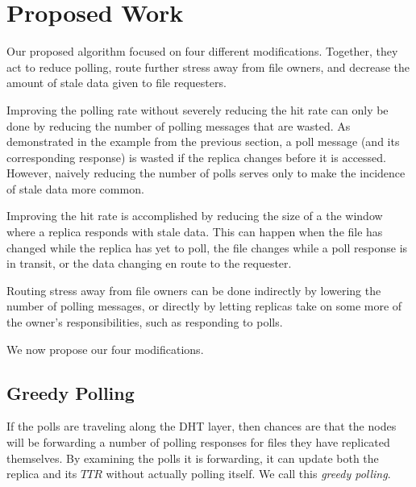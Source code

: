 \documentclass[10pt, conference, compsocconf, letterpaper]{IEEEtran} %
\begin{document}






\section{Proposed Work}

Our proposed algorithm focused on four different modifications.  Together, they act to reduce polling, route further stress away from file owners, and decrease the amount of stale data given to file requesters.
 
Improving the polling rate without severely reducing the hit rate can only be done by reducing the number of polling messages that are wasted.  As demonstrated in the example from the previous section, a poll message (and its corresponding response) is wasted if the replica changes before it is accessed.  However, naively reducing the number of polls serves only to make the incidence of stale data more common.


Improving the hit rate is accomplished by reducing the size of a the window where a replica responds with stale data.  This can happen when the file has changed while the replica has yet to poll, the file changes while a poll response is in transit, or the data changing en route to the requester.

Routing stress away from file owners can be done indirectly by lowering the number of polling messages, or directly by letting replicas take on some more of the owner's responsibilities, such as responding to polls.

We now propose our four modifications.



\subsection{Greedy Polling}
If the polls are traveling along the DHT layer, then chances are that the nodes will be forwarding a number of polling responses for files they have replicated themselves.  By examining the polls it is forwarding, it can update both the replica and its $TTR$  without actually polling itself. We call this \emph{greedy polling}.
\end{document}
